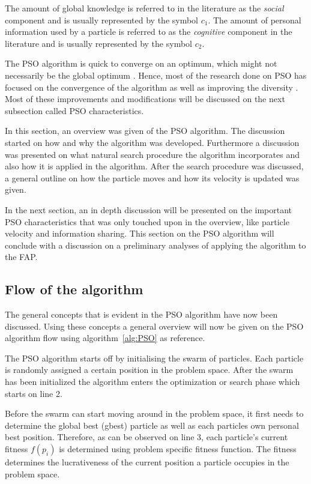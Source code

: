 The amount of global knowledge is referred to in the literature as the \emph{social} \label{def:socialcomponent} component \cite{FundamentalSwarm,CompuIntelligenceIntro,PSOSelfHierarch,SOSwarm} and is usually represented by the symbol $c_1$. The amount of personal information used by a particle is referred to as the \emph{cognitive} \label{def:cognitivecomponent} component in the literature and is usually represented by the symbol $c_2$\cite{FundamentalSwarm,CompuIntelligenceIntro,PSOSelfHierarch,SOSwarm}.

The PSO algorithm is quick to converge on an optimum, which might not necessarily be the global optimum \cite{PSOSelfHierarch}. Hence, most of the research done on PSO has focused on the convergence of the algorithm as well as improving the diversity \cite{FundamentalSwarm}. Most of these improvements and modifications will be discussed on the next subsection called PSO characteristics.

In this section, an overview was given of the PSO algorithm. The discussion started on how and why the algorithm was developed. Furthermore a discussion was presented on what natural search procedure the algorithm incorporates and also how it is applied in the algorithm. After the search procedure was discussed, a general outline on how the particle moves and how its velocity is updated was given. 

In the next section, an in depth discussion will be presented on the important PSO characteristics that was only touched upon in the overview, like particle velocity and information sharing. This section on the PSO algorithm will conclude with a discussion on a preliminary analyses of applying the algorithm to the FAP.
\subsection{Flow of the algorithm}
The general concepts that is evident in the PSO algorithm have now been discussed. Using these concepts a general overview will now be given on the PSO algorithm flow using algorithm~\ref{alg:PSO} as reference.

The PSO algorithm starts off by initialising the swarm of particles. Each particle is randomly assigned a certain position in the problem space. After the swarm has been initialized the algorithm enters the optimization or search phase which starts on line 2.

Before the swarm can start moving around in the problem space, it first needs to determine the global best (gbest) particle as well as each particles own personal best position. Therefore, as can be observed on line 3, each particle's current fitness $f(p_i)$ is determined using problem specific fitness function. The fitness determines the lucrativeness of the current position a particle occupies in the problem space.

